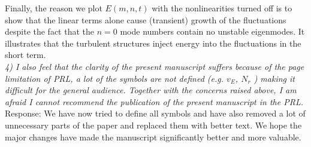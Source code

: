 \documentclass[12pt]{article}
\begin{document}
Finally, the reason we plot $E(m,n,t)$ with the nonlinearities turned off is to show that the linear terms alone cause (transient) growth of the fluctuations despite the fact that the $n=0$ mode numbers contain no unstable eigenmodes. It illustrates that the turbulent structures inject energy into the fluctuations in the short term. \\


\emph{4) I also feel that the clarity of the present manuscript suffers because of the page limitation of
PRL, a lot of the symbols are not defined (e.g. $v_E$, $N_r$ ) making it difficult for the general audience.
Together with the concerns raised above, I am afraid I cannot recommend the publication of the
present manuscript in the PRL.} \\


Response: We have now tried to define all symbols and have also removed a lot of unnecessary parts of the paper and replaced them with better text. We hope the major changes have made the manuscript significantly better and more valuable. \\





%
%
\end{document}
